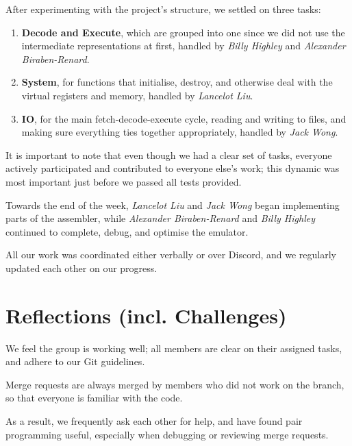 \documentclass{ictex}
\begin{document}
After experimenting with the project's structure, we settled on three tasks:

\begin{enumerate}
    \item \textbf{Decode and Execute}, which are grouped into one since we did not use the intermediate representations at first, handled by \textit{Billy Highley} and \textit{Alexander Biraben-Renard}.
    \item \textbf{System}, for functions that initialise, destroy, and otherwise deal with the virtual registers and memory, handled by \textit{Lancelot Liu}.
    \item \textbf{IO}, for the main fetch-decode-execute cycle, reading and writing to files, and making sure everything ties together appropriately, handled by \textit{Jack Wong}.
\end{enumerate}

\vspace{1em} \begin{formal}
    It is important to note that even though we had a clear set of tasks, everyone actively participated and contributed to everyone else's work; this dynamic was most important just before we passed all tests provided.
\end{formal}

Towards the end of the week, \textit{Lancelot Liu} and \textit{Jack Wong} began implementing parts of the assembler, while \textit{Alexander Biraben-Renard} and \textit{Billy Highley} continued to complete, debug, and optimise the emulator.

All our work was coordinated either verbally or over Discord, and we regularly updated each other on our progress.

\section{Reflections (incl. Challenges)}

We feel the group is working well; all members are clear on their assigned tasks, and adhere to our Git guidelines.

\vspace{1em} \begin{formal}
    Merge requests are always merged by members who did not work on the branch, so that everyone is familiar with the code.
\end{formal}

As a result, we frequently ask each other for help, and have found pair programming useful, especially when debugging or reviewing merge requests.
\end{document}
